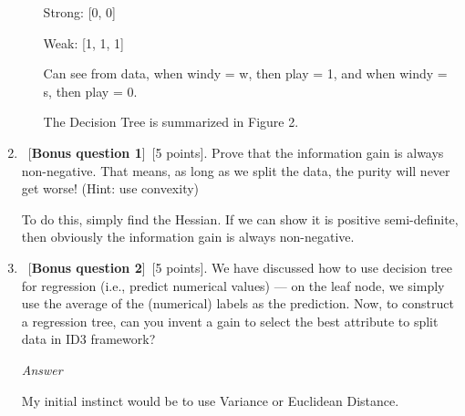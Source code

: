\documentclass[12pt, fullpage,letterpaper]{article}
\begin{document}
\begin{enumerate}
\begin{enumerate}
Strong: [0, 0]

Weak: [1, 1, 1]

\vspace{5mm}

Can see from data, when windy = w, then play = 1, and when windy = s, then play = 0.

\vspace{5mm}

The Decision Tree is summarized in Figure 2.

\end{enumerate}
\item ~[\textbf{Bonus question 1}]~[5 points].  Prove that the information gain is always non-negative.  That means, as long as we split the data, the purity will never get worse! (Hint: use convexity)

To do this, simply find the Hessian. If we can show it is positive semi-definite, then obviously the information gain is always non-negative.

\item ~[\textbf{Bonus question 2}]~[5 points].  We have discussed how to use decision tree for regression (i.e., predict numerical values) --- on the leaf node, we simply use the average of the (numerical) labels as the prediction.  Now, to construct a regression tree, can you invent a gain to select the best attribute to split data in ID3 framework?

\emph{Answer}

My initial instinct would be to use Variance or Euclidean Distance.

\end{enumerate}
\end{document}
